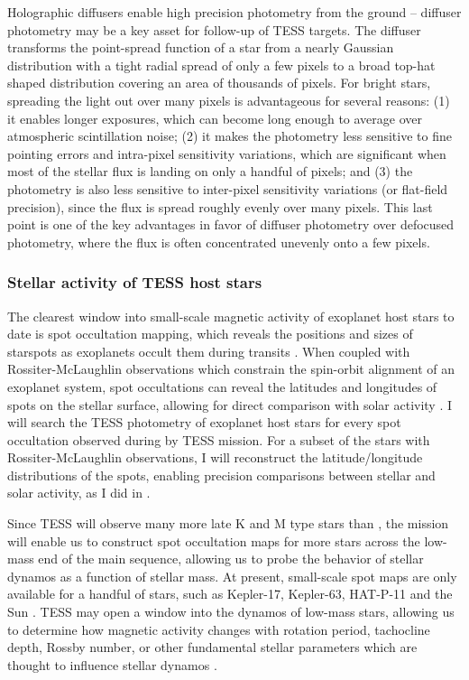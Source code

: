 Holographic diffusers enable high precision photometry from the ground \citep{Stefansson2017,Stefansson2018} -- diffuser photometry may be a key asset for follow-up of TESS targets. The diffuser transforms the point-spread function of a star from a nearly Gaussian distribution with a tight radial spread of only a few pixels to a broad top-hat shaped distribution covering an area of thousands of pixels. For bright stars, spreading the light out over many pixels is advantageous for several reasons: (1) it enables longer exposures, which can become long enough to average over atmospheric scintillation noise; (2) it makes the photometry less sensitive to fine pointing errors and intra-pixel sensitivity variations, which are significant when most of the stellar flux is landing on only a handful of pixels; and (3) the photometry is also less sensitive to inter-pixel sensitivity variations (or flat-field precision), since the flux is spread roughly evenly over many pixels. This last point is one of the key advantages in favor of diffuser photometry over defocused photometry, where the flux is often concentrated unevenly onto a few pixels.

\subsubsection{Stellar activity of TESS host stars}

The clearest window into small-scale magnetic activity of exoplanet host stars to date is spot occultation mapping, which reveals the positions and sizes of starspots as exoplanets occult them during transits \citep{Sanchis-Ojeda2011}. When coupled with Rossiter-McLaughlin observations which constrain the spin-orbit alignment of an exoplanet system, spot occultations can reveal the latitudes and longitudes of spots on the stellar surface, allowing for direct comparison with solar activity \citep{Winn2010, Morris2017a}. I will search the TESS photometry of exoplanet host stars for every spot occultation observed during by TESS mission. For a subset of the stars with Rossiter-McLaughlin observations, I will reconstruct the latitude/longitude distributions of the spots, enabling precision comparisons between stellar and solar activity, as I did in \citep{Morris2017a}. 

Since TESS will observe many more late K and M type stars than \kepler \citep{Muirhead2018}, the mission will enable us to construct spot occultation maps for more stars across the low-mass end of the main sequence, allowing us to probe the behavior of stellar dynamos as a function of stellar mass. At present, small-scale spot maps are only available for a handful of stars, such as Kepler-17, Kepler-63, HAT-P-11 and the Sun \citep{Solanki2003,Davenportthesis,Sanchis-Ojeda2013,Morris2017a}. TESS may open a window into the dynamos of low-mass stars, allowing us to determine how magnetic activity changes with rotation period, tachocline depth, Rossby number, or other fundamental stellar parameters which are thought to influence stellar dynamos \citep{Berdyugina2005, Gilman2018}. 

